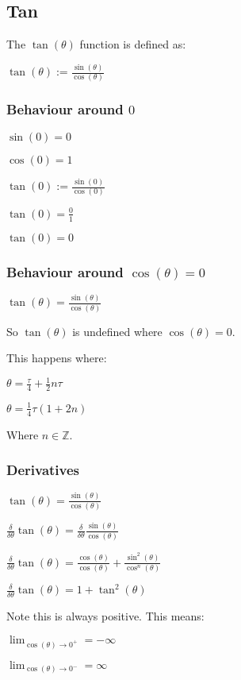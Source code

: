
\subsection{Tan}


The \(\tan(\theta )\) function is defined as:

$\tan(\theta ):=\frac{\sin(\theta )}{\cos(\theta )}$

\subsubsection{Behaviour around \(0\)}

$\sin(0)=0$

$\cos(0)=1$

$\tan(0):=\frac{\sin(0)}{\cos(0)}$

$\tan(0)=\frac{0}{1}$

$\tan(0)=0$

\subsubsection{Behaviour around \(\cos(\theta )=0\)}

$\tan(\theta )=\frac{\sin(\theta )}{\cos(\theta )}$

So \(\tan (\theta )\) is undefined where \(\cos(\theta )=0\).

This happens where:

$\theta=\frac{\tau }{4}+\frac{1}{2}n\tau$

$\theta=\frac{1}{4}\tau (1+2n)$

Where \(n\in \mathbb{Z}\).

\subsubsection{Derivatives}

$\tan(\theta )=\frac{\sin(\theta )}{\cos(\theta )}$

$\frac{\delta }{\delta \theta } \tan(\theta )=\frac{\delta }{\delta \theta }\frac{\sin(\theta )}{\cos(\theta )}$

$\frac{\delta }{\delta \theta } \tan(\theta )=\frac{\cos(\theta )}{\cos(\theta )}+ \frac{\sin^2(\theta )}{\cos^n(\theta )}$

$\frac{\delta }{\delta \theta } \tan(\theta )=1+\tan^2(\theta ) $

Note this is always positive. This means:

$\lim_{\cos(\theta )\rightarrow 0^+}=-\infty$

$\lim_{\cos(\theta )\rightarrow 0^-}=\infty$

